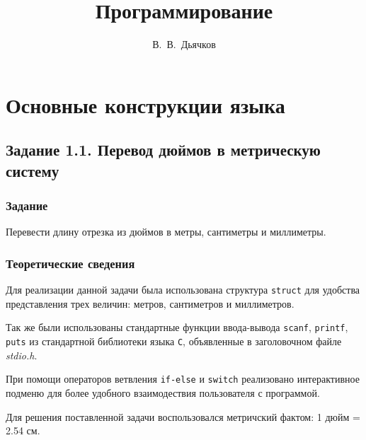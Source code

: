 \documentclass[12pt,a4paper]{report}
\author{В.~В.~Дьячков}
\title{Программирование}
\begin{document}
\maketitle

\tableofcontents{}

\chapter{Основные конструкции языка}
\section{Задание 1.1. Перевод дюймов в метрическую систему}
\subsection{Задание}

\hspace{\parindent}Перевести длину отрезка из дюймов в метры, сантиметры и миллиметры.

\subsection{Теоретические сведения}
\hspace{\parindent}Для реализации данной задачи была использована структура \texttt{struct} для удобства представления трех величин: метров, сантиметров и миллиметров. 

Так же были использованы стандартные функции ввода-вывода \texttt{scanf}, \texttt{printf}, \texttt{puts} из стандартной библиотеки языка \verb+С+, объявленные в заголовочном файле \textit{stdio.h}.

При помощи операторов ветвления \texttt{if-else} и \texttt{switch} реализовано интерактивное подменю для более удобного взаимодествия пользователя с программой.

Для решения поставленной задачи воспользовался метричский фактом: 1 дюйм = 2.54 см.
\end{document}
